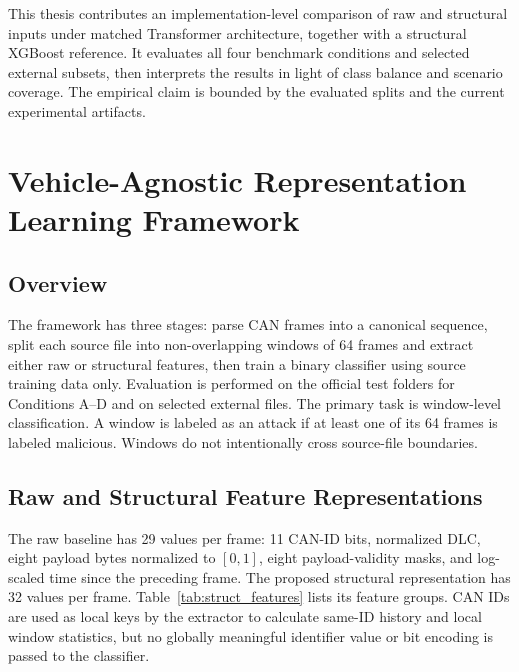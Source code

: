 \documentclass[12pt, a4paper, reqno, oneside]{book}
\begin{document}
This thesis contributes an implementation-level comparison of raw and structural inputs under matched Transformer architecture, together with a structural XGBoost reference. It evaluates all four benchmark conditions and selected external subsets, then interprets the results in light of class balance and scenario coverage. The empirical claim is bounded by the evaluated splits and the current experimental artifacts.

\chapter{Vehicle-Agnostic Representation Learning Framework}
\label{chap:method}

\section{Overview}
\label{sec:method_overview}
The framework has three stages: parse CAN frames into a canonical sequence, split each source file into non-overlapping windows of 64 frames and extract either raw or structural features, then train a binary classifier using source training data only. Evaluation is performed on the official test folders for Conditions A--D and on selected external files. The primary task is window-level classification. A window is labeled as an attack if at least one of its 64 frames is labeled malicious. Windows do not intentionally cross source-file boundaries.

\section{Raw and Structural Feature Representations}
\label{sec:method_features}
The raw baseline has 29 values per frame: 11 CAN-ID bits, normalized DLC, eight payload bytes normalized to $[0,1]$, eight payload-validity masks, and log-scaled time since the preceding frame. The proposed structural representation has 32 values per frame. Table~\ref{tab:struct_features} lists its feature groups. CAN IDs are used as local keys by the extractor to calculate same-ID history and local window statistics, but no globally meaningful identifier value or bit encoding is passed to the classifier.
\end{document}
